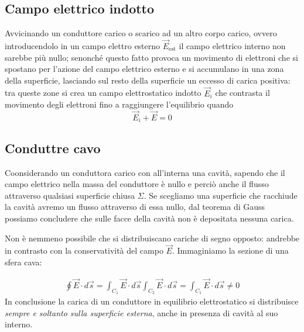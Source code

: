 \documentclass[x11names]{report}
\begin{document}
\subsection{Campo elettrico indotto}
Avvicinando un conduttore carico o scarico ad un altro corpo carico, ovvero introducendolo in un campo elettro esterno \(\vec{E}_\text{est}\) il campo elettrico interno non sarebbe più nullo; senonché questo fatto provoca un movimento di elettroni che si spostano per l'azione del campo elettrico esterno e si accumulano in una zona della superficie, lasciando sul resto della superficie un eccesso di carica positiva: tra queste zone si crea un campo elettrostatico indotto \(\vec{E}_i\) che contrasta il movimento degli elettroni fino a raggiungere l'equilibrio quando
\[
\vec{E}_i + \vec{E} = 0
	\]
\begin{figure}[H]
	\centering
\end{figure}

\subsection{Conduttre cavo}
Coonsiderando un conduttora carico con all'interna una cavità, sapendo che il campo elettrico nella massa del conduttore è nullo e perciò anche il flusso attraverso qualsiasi superficie chiusa \(\Sigma\). Se scegliamo una superficie che racchiude la cavità avremo un flusso attraverso di essa nullo, dal teorema di Gauss possiamo concludere che sulle facce della cavità non è depositata nessuna carica.

Non è nemmeno possibile che si distribuiscano cariche di segno opposto: andrebbe in contrasto con la  conservatività del campo \(\vec{E}\). Immaginiamo la sezione di una sfera cava:
\begin{figure}[H]
	\centering
\end{figure}
\begin{gather*}
	\oint \vec{E} \cdot d\vec{s} = \int_{C_1} \vec{E} \cdot d\vec{s} \int_{C_2} \vec{E} \cdot d\vec{s} = \int_{C_1} \vec{E} \cdot d\vec{s} \neq 0
\end{gather*}
In conclusione la carica di un conduttore in equilibrio elettrostatico si distribuisce \textit{sempre e soltanto sulla superficie esterna}, anche in presenza di cavità al suo interno. \\
\end{document}

